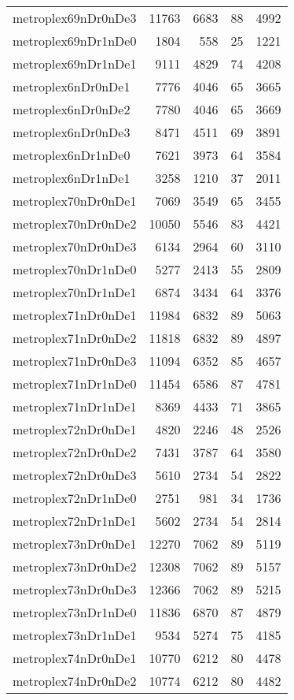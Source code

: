 \begin{longtable}{lrrrr}
metroplex69nDr0nDe3 & 11763 & 6683 & 88 & 4992 \\
metroplex69nDr1nDe0 & 1804 & 558 & 25 & 1221 \\
metroplex69nDr1nDe1 & 9111 & 4829 & 74 & 4208 \\
metroplex6nDr0nDe1 & 7776 & 4046 & 65 & 3665 \\
metroplex6nDr0nDe2 & 7780 & 4046 & 65 & 3669 \\
metroplex6nDr0nDe3 & 8471 & 4511 & 69 & 3891 \\
metroplex6nDr1nDe0 & 7621 & 3973 & 64 & 3584 \\
metroplex6nDr1nDe1 & 3258 & 1210 & 37 & 2011 \\
metroplex70nDr0nDe1 & 7069 & 3549 & 65 & 3455 \\
metroplex70nDr0nDe2 & 10050 & 5546 & 83 & 4421 \\
metroplex70nDr0nDe3 & 6134 & 2964 & 60 & 3110 \\
metroplex70nDr1nDe0 & 5277 & 2413 & 55 & 2809 \\
metroplex70nDr1nDe1 & 6874 & 3434 & 64 & 3376 \\
metroplex71nDr0nDe1 & 11984 & 6832 & 89 & 5063 \\
metroplex71nDr0nDe2 & 11818 & 6832 & 89 & 4897 \\
metroplex71nDr0nDe3 & 11094 & 6352 & 85 & 4657 \\
metroplex71nDr1nDe0 & 11454 & 6586 & 87 & 4781 \\
metroplex71nDr1nDe1 & 8369 & 4433 & 71 & 3865 \\
metroplex72nDr0nDe1 & 4820 & 2246 & 48 & 2526 \\
metroplex72nDr0nDe2 & 7431 & 3787 & 64 & 3580 \\
metroplex72nDr0nDe3 & 5610 & 2734 & 54 & 2822 \\
metroplex72nDr1nDe0 & 2751 & 981 & 34 & 1736 \\
metroplex72nDr1nDe1 & 5602 & 2734 & 54 & 2814 \\
metroplex73nDr0nDe1 & 12270 & 7062 & 89 & 5119 \\
metroplex73nDr0nDe2 & 12308 & 7062 & 89 & 5157 \\
metroplex73nDr0nDe3 & 12366 & 7062 & 89 & 5215 \\
metroplex73nDr1nDe0 & 11836 & 6870 & 87 & 4879 \\
metroplex73nDr1nDe1 & 9534 & 5274 & 75 & 4185 \\
metroplex74nDr0nDe1 & 10770 & 6212 & 80 & 4478 \\
metroplex74nDr0nDe2 & 10774 & 6212 & 80 & 4482 \\

\end{longtable}
